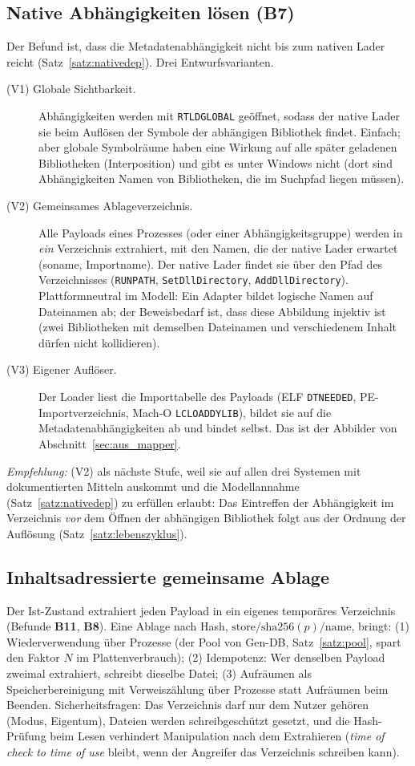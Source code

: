 \documentclass[a4paper,12pt,twoside]{report}
\DeclareRobustCommand{\_}{\ifmmode\mbox{\textunderscore}\else\textunderscore\allowbreak{}\fi}
\theoremstyle{definition}
\newcommand{\Bf}[1]{\textbf{B#1}}
\begin{document}
\subsection{Native Abhängigkeiten lösen (\Bf{7})}
\label{sec:aus_nativ}
Der Befund ist, dass die Metadatenabhängigkeit nicht bis zum nativen Lader reicht (Satz~\ref{satz:nativedep}). Drei Entwurfsvarianten.
\begin{description}
	\item[(V1) Globale Sichtbarkeit.] Abhängigkeiten werden mit \texttt{RTLD\_GLOBAL} geöffnet, sodass der native Lader sie beim Auflösen der Symbole der abhängigen Bibliothek findet. Einfach; aber globale Symbolräume haben eine Wirkung auf alle später geladenen Bibliotheken (Interposition) und gibt es unter Windows nicht (dort sind Abhängigkeiten Namen von Bibliotheken, die im Suchpfad liegen müssen).
	\item[(V2) Gemeinsames Ablageverzeichnis.] Alle Payloads eines Prozesses (oder einer Abhängigkeitsgruppe) werden in \emph{ein} Verzeichnis extrahiert, mit den Namen, die der native Lader erwartet (soname, Importname). Der native Lader findet sie über den Pfad des Verzeichnisses (\texttt{RUNPATH}, \texttt{SetDllDirectory}, \texttt{AddDllDirectory}). Plattformneutral im Modell: Ein Adapter bildet logische Namen auf Dateinamen ab; der Beweisbedarf ist, dass diese Abbildung injektiv ist (zwei Bibliotheken mit demselben Dateinamen und verschiedenem Inhalt dürfen nicht kollidieren).
	\item[(V3) Eigener Auflöser.] Der Loader liest die Importtabelle des Payloads (ELF \texttt{DT\_NEEDED}, PE-Importverzeichnis, Mach-O \texttt{LC\_LOAD\_DYLIB}), bildet sie auf die Metadatenabhängigkeiten ab und bindet selbst. Das ist der Abbilder von Abschnitt~\ref{sec:aus_mapper}.
\end{description}
\emph{Empfehlung:} (V2) als nächste Stufe, weil sie auf allen drei Systemen mit dokumentierten Mitteln auskommt und die Modellannahme (Satz~\ref{satz:nativedep}) zu erfüllen erlaubt: Das Eintreffen der Abhängigkeit im Verzeichnis \emph{vor} dem Öffnen der abhängigen Bibliothek folgt aus der Ordnung der Auflösung (Satz~\ref{satz:lebenszyklus}).

\subsection{Inhaltsadressierte gemeinsame Ablage}
\label{sec:aus_cas}
Der Ist-Zustand extrahiert jeden Payload in ein eigenes temporäres Verzeichnis (Befunde \Bf{11}, \Bf{8}). Eine Ablage nach Hash, $\mathrm{store}/\mathrm{sha256}(p)/\mathrm{name}$, bringt: (1) Wiederverwendung über Prozesse (der Pool von Gen-DB, Satz~\ref{satz:pool}, spart den Faktor $N$ im Plattenverbrauch); (2) Idempotenz: Wer denselben Payload zweimal extrahiert, schreibt dieselbe Datei; (3) Aufräumen als Speicherbereinigung mit Verweiszählung über Prozesse statt Aufräumen beim Beenden. Sicherheitsfragen: Das Verzeichnis darf nur dem Nutzer gehören (Modus, Eigentum), Dateien werden schreibgeschützt gesetzt, und die Hash-Prüfung beim Lesen verhindert Manipulation nach dem Extrahieren (\emph{time of check to time of use} bleibt, wenn der Angreifer das Verzeichnis schreiben kann).
\end{document}
